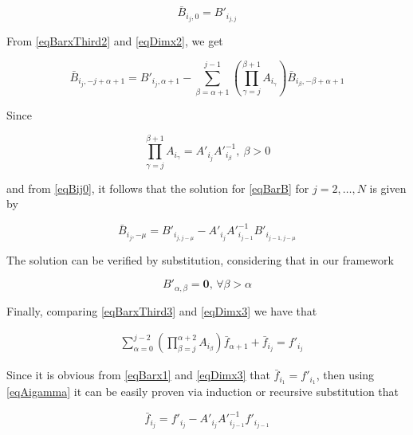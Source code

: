 \documentclass[letterpaper, 10 pt, conference]{ifacconf}  %
\begin{document}
\begin{pf}
	\small
	\begin{equation}\label{eqBij0}
	\bar B_{i_j,0}=B'_{i_{j,j}}
	\end{equation}
	\normalsize
	
	From \eqref{eqBarxThird2} and \eqref{eqDimx2}, we get

	\small
	\begin{equation}\label{eqBarB}
	\bar B_{i_j,-j+\alpha+1} = B'_{i_j,\alpha+1} - \sum_{\beta=\alpha+1}^{j-1}{\left(\prod_{\gamma=j}^{\beta+1}{A_{i_\gamma}}\right)\bar B_{i_{\beta},-\beta+\alpha+1}}
	\end{equation}
	\normalsize
	
	Since 
	
	\small
	\begin{equation}\label{eqAigamma}
	\prod_{\gamma=j}^{\beta+1}{A_{i_\gamma}}=A'_{i_j}A'^{-1}_{i_\beta},\ \beta > 0
	\end{equation}
	\normalsize
	
	and from \eqref{eqBij0}, it follows that the solution for \eqref{eqBarB} for $j=2,\ldots,N$ is given by
	
	\small
	\begin{equation}\label{eqBarBij1}
	\bar B_{i_j,-\mu} = B'_{i_{j,j-\mu}} - A'_{i_j}A'^{-1}_{i_{j-1}}B'_{i_{j-1,j-\mu}}
	\end{equation}
	\normalsize
	
	The solution can be verified by substitution, considering that in our framework

	\small
	\begin{equation}
	B'_{\alpha,\beta}=\mathbf{0},\,\forall\beta>\alpha
	\end{equation}
	\normalsize

	Finally, comparing \eqref{eqBarxThird3} and \eqref{eqDimx3} we have that
	
	\small
	\begin{align}
		&\sum_{\alpha=0}^{j-2}{\left(\prod_{\beta=j}^{\alpha + 2}{A_{i_\beta}}\right)\bar f_{\alpha+1}} + \bar f_{i_j} = f'_{i_j}
	\end{align}
	\normalsize
	
	Since it is obvious from \eqref{eqBarx1} and \eqref{eqDimx3} that $\bar f_{i_1}=f'_{i_1}$, then using \eqref{eqAigamma} it can be easily proven via induction or recursive substitution that
	
	\small
	\begin{equation}\label{eqBarfij}
		\bar f_{i_j} = f'_{i_j} -A'_{i_j}A'^{-1}_{i_{j-1}}f'_{i_{j-1}}
	\end{equation}
	\normalsize
	

\end{pf}
\end{document}
